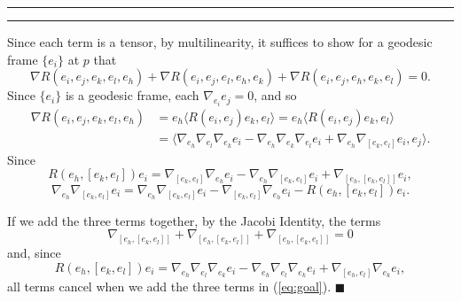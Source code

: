 \documentclass[11pt]{article}
\newcounter{questionCounter}
\newcounter{partCounter}[questionCounter]
\newenvironment{question}[2][\arabic{questionCounter}]{%
    \setcounter{partCounter}{0}%
    \vspace{.25in} \hrule \vspace{0.5em}%
        \noindent{\bf #2}%
    \vspace{0.8em} \hrule \vspace{.10in}%
    \addtocounter{questionCounter}{1}%
}{}
\renewcommand{\qed}{\quad \ensuremath{\blacksquare}}    %
\begin{document}
\begin{question}{Exercise 7}
Since each term is a tensor, by multilinearity, it suffices to show for a
geodesic frame $\{e_i\}$ at $p$ that
\begin{equation}
\label{eq:goal}
\nabla R(e_i,e_j,e_k,e_l,e_h)
    + \nabla R(e_i,e_j,e_l,e_h,e_k)
    + \nabla R(e_i,e_j,e_h,e_k,e_l) = 0.
\end{equation}
Since $\{e_i\}$ is a geodesic frame, each $\nabla_{e_i} e_j = 0$, and so
\begin{align*}
\nabla R(e_i,e_j,e_k,e_l,e_h)
 &  = e_h \langle R(e_i,e_j)e_k, e_l \rangle
    = e_h \langle R(e_i,e_j)e_k, e_l \rangle    \\
 &  = \langle \nabla_{e_h} \nabla_{e_l} \nabla_{e_k} e_i
    - \nabla_{e_h} \nabla_{e_k} \nabla_{e_l} e_i
    + \nabla_{e_h} \nabla_{[e_k,e_l]} e_i, e_j \rangle.
\end{align*}
Since
\[R(e_h,[e_k,e_l])e_i
    = \nabla_{[e_k,e_l]}\nabla_{e_h} e_i
    - \nabla_{e_h}\nabla_{[e_k,e_l]} e_i
    + \nabla_{[e_h,[e_k,e_l]]} e_i,
\]
\[\nabla_{e_h} \nabla_{[e_k,e_l]} e_i
    = \nabla_{e_h}\nabla_{[e_k,e_l]} e_i
    - \nabla_{[e_k,e_l]}\nabla_{e_h} e_i
    - R(e_h,[e_k,e_l])e_i.
\]

If we add the three terms together, by the Jacobi Identity, the terms
\[\nabla_{[e_h,[e_k,e_l]]}
    + \nabla_{[e_h,[e_k,e_l]]}
    + \nabla_{[e_h,[e_k,e_l]]}
    = 0
\]
and, since
\[R(e_h,[e_k,e_l])e_i
    = \nabla_{e_h} \nabla_{e_l} \nabla_{e_k} e_i
    - \nabla_{e_h} \nabla_{e_l} \nabla_{e_k} e_i
    + \nabla_{[e_h,e_l]} \nabla_{e_k} e_i,
\]
all terms cancel when we add the three terms in (\ref{eq:goal}). \qed
\end{question}
\end{document}

